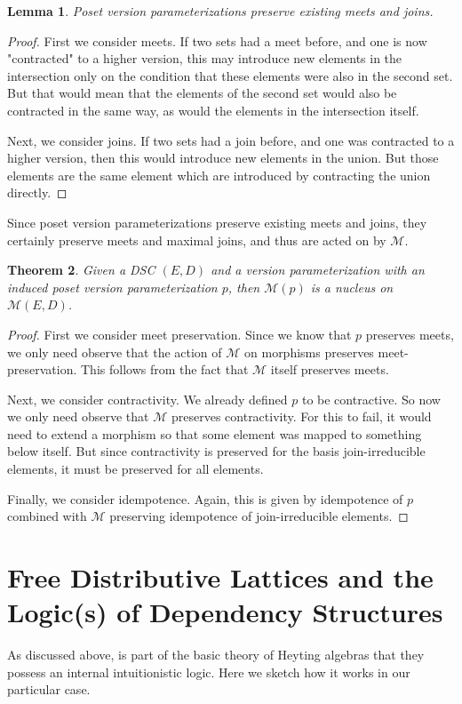 \documentclass[hoptionsi,review,format=acmsmall]{acmart}
\newtheorem{theorem}{Theorem}[section]
\newtheorem{lemma}[theorem]{Lemma}
\theoremstyle{definition}
\newcommand{\Mcc}{\mathcal{M}}
\begin{document}
\begin{lemma}
Poset version parameterizations preserve existing meets and joins.
\end{lemma}
\begin{proof}
First we consider meets. If two sets had a meet before, and one is now "contracted" to a higher version, this may introduce new elements in the intersection only on the condition that these elements were also in the second set. But that would mean that the elements of the second set would also be contracted in the same way, as would the elements in the intersection itself.

Next, we consider joins. If two sets had a join before, and one was contracted to a higher version, then this would introduce new elements in the union. But those elements are the same element which are introduced by contracting the union directly.
\end{proof}

Since poset version parameterizations preserve existing meets and joins, they certainly preserve meets and maximal joins, and thus are acted on by \(\Mcc\).

\begin{theorem}
Given a DSC \((E,D)\) and a version parameterization with an induced poset version parameterization \(p\), then \(\Mcc(p)\) is a nucleus on \(\Mcc(E,D)\).
\end{theorem}
\begin{proof}
First we consider meet preservation. Since we know that \(p\) preserves meets, we only need observe that the action of \(\Mcc\) on morphisms preserves meet-preservation. This follows from the fact that \(\Mcc\) itself preserves meets.


Next, we consider contractivity. We already defined \(p\) to be contractive. So now we only need observe that \(\Mcc\) preserves contractivity. For this to fail, it would need to extend a morphism so that some element was mapped to something below itself. But since contractivity is preserved for the basis join-irreducible elements, it must be preserved for all elements.

Finally, we consider idempotence. Again, this is given by idempotence of \(p\) combined with \(\Mcc\) preserving idempotence of join-irreducible elements.
\end{proof}


\section{Free Distributive Lattices and the Logic(s) of Dependency Structures}
As discussed above, is part of the basic theory of Heyting algebras that they possess an internal intuitionistic logic. Here we sketch how it works in our particular case.
\end{document}
